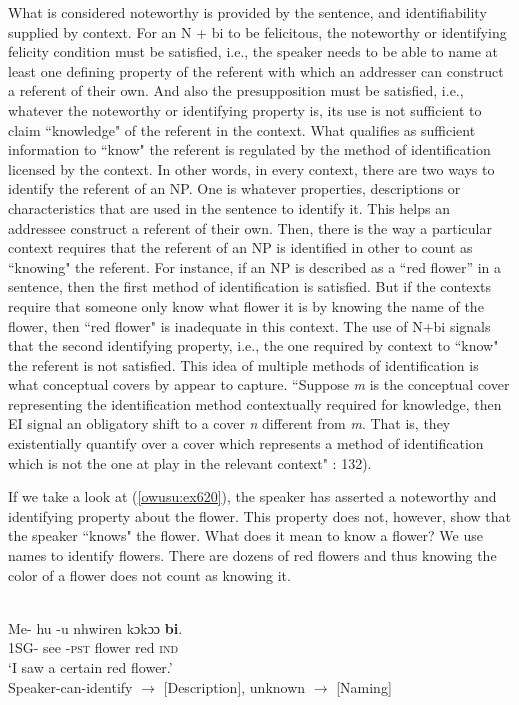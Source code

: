 \documentclass[output=paper,modfonts,nonflat,draftmode]{langsci/langscibook}
\begin{document}
 \z\z What is considered noteworthy is provided by the sentence, and identifiability supplied by context. 
For an N + bi to be felicitous, the noteworthy or identifying felicity condition must be satisfied, i.e., the speaker needs to be able to name at least one defining property of the referent with which an addresser can construct a referent of their own. And also the presupposition must be satisfied, i.e., whatever the noteworthy or identifying property is, its use is not sufficient to claim ``knowledge" of the referent in the context. What qualifies as sufficient information to ``know" the referent is regulated by the method of identification licensed by the context. In other words, in every context, there are two ways to identify the referent of an NP. One is whatever properties, descriptions or characteristics that are used in the sentence to identify it. This helps an addressee construct a referent of their own. Then, there is the way a particular context requires that the referent of an NP is identified in other to count as ``knowing" the referent. For instance, if an NP is described as a ``red flower'' in a sentence, then the first method of identification is satisfied. But if the contexts require that someone only know what flower it is by knowing the name of the flower, then ``red flower" is inadequate in this context. The use of N+bi signals that the second identifying property, i.e., the one required by context to ``know" the referent is not satisfied. This idea of multiple methods of identification is what conceptual covers by \citet{AloniPort2015} appear to capture. ``Suppose \emph{m} is the conceptual cover representing the identification method contextually required for knowledge, then EI signal an obligatory shift to a cover \emph{n} different from \emph{m}. That is, they existentially quantify over a cover which represents a method of identification which is not the one at play in the relevant context" \citep{AloniPort2015}: 132). 

If we take a look at (\ref{owusu:ex620}), the speaker has asserted a noteworthy and identifying property about the flower.  This property does not, however, show that the speaker ``knows" the flower. What does it mean to know a flower? We use names to identify flowers. There are dozens of red flowers and thus knowing the color of a flower does not count as knowing it. 


\ea\label{owusu:ex620}\\
\gll Me- hu -u nhwiren kɔkɔɔ \textbf{bi}.\\
 1SG- see -\textsc{pst}  flower red \textsc{ind} \\
\glt `I saw a certain red flower.'\\
Speaker-can-identify $\rightarrow$ [Description], unknown $\rightarrow$  [Naming]
\end{document}
